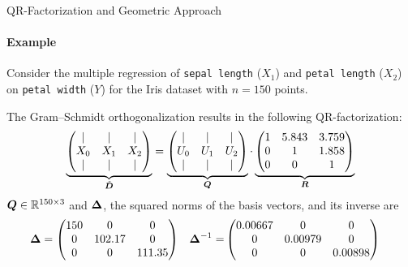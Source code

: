 \begin{frame}{QR-Factorization and Geometric Approach}
\framesubtitle{Example}
Consider the multiple regression of
{\tt sepal length} ($X_1$) and {\tt petal
    length} ($X_2$) on {\tt petal width} ($Y$)
for the Iris dataset with $n=150$ points.


\medskip

The Gram--Schmidt orthogonalization results in the following
QR-factorization:
\begin{align*}
    \underbrace{
    \begin{pmatrix} 
      | & |   &  | \\
      X_0 & X_1 & X_2\\
    |   & |   & | \\
     \end{pmatrix}}_{\tilde{{\boldsymbol D}}} 
    = 
    \underbrace{
    \begin{pmatrix} 
      | & |   &  | \\
      U_0 & U_1 & U_2\\
    |   & |   & | \\
     \end{pmatrix}}_{{\boldsymbol Q}} 
    \cdot
    \underbrace{
    \begin{pmatrix} 
        1 & 5.843 & 3.759\\
        0 & 1 & 1.858\\
        0 & 0 & 1
     \end{pmatrix}}_{{\boldsymbol R}} 
\end{align*}
${\boldsymbol Q} \in {\mathord{\mathbb R}}^{150\times 3}$ 
and ${\bm \Delta}$, the squared norms of the basis vectors, and
its inverse are
\begin{align*}
    {\bm \Delta} & = 
    \begin{pmatrix} 
   150 & 0 & 0\\
   0 & 102.17 & 0\\
   0 & 0 & 111.35  \end{pmatrix} &
   {\bm \Delta}^{-1} = &
    \begin{pmatrix} 
        0.00667 & 0 & 0\\
        0 & 0.00979 & 0\\
    0 & 0 & 0.00898  \end{pmatrix}
\end{align*}
\end{frame}

